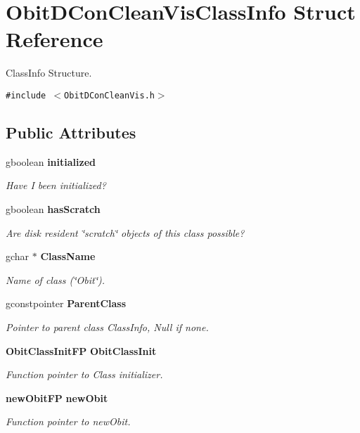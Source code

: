 \section{Obit\-DCon\-Clean\-Vis\-Class\-Info Struct Reference}
\label{structObitDConCleanVisClassInfo}
Class\-Info Structure.  


{\tt \#include $<$Obit\-DCon\-Clean\-Vis.h$>$}

\subsection*{Public Attributes}
\begin{CompactItemize}
\item 
gboolean {\bf initialized}
\begin{CompactList}\small\item\em Have I been initialized? \item\end{CompactList}\item 
gboolean {\bf has\-Scratch}
\begin{CompactList}\small\item\em Are disk resident \char`\"{}scratch\char`\"{} objects of this class possible? \item\end{CompactList}\item 
gchar $\ast$ {\bf Class\-Name}
\begin{CompactList}\small\item\em Name of class (\char`\"{}Obit\char`\"{}). \item\end{CompactList}\item 
gconstpointer {\bf Parent\-Class}
\begin{CompactList}\small\item\em Pointer to parent class Class\-Info, Null if none. \item\end{CompactList}\item 
{\bf Obit\-Class\-Init\-FP} {\bf Obit\-Class\-Init}
\begin{CompactList}\small\item\em Function pointer to Class initializer. \item\end{CompactList}\item 
{\bf new\-Obit\-FP} {\bf new\-Obit}
\begin{CompactList}\small\item\em Function pointer to new\-Obit. \item\end{CompactList}\item 

\end{CompactItemize}
